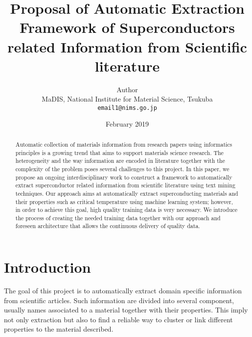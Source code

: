 \documentclass{article}
\title{Proposal of Automatic Extraction Framework of Superconductors related Information from Scientific literature}
\author{
  Author\\
  MaDIS, National Institute for Material Science, Tsukuba\\
  \texttt{email1@nims.go.jp}
}
\date{February 2019}
\begin{document}
\maketitle

\tableofcontents

\pagebreak

\begin{abstract}
Automatic collection of materials information from research papers using informatics principles is a growing trend that aims to support materials science research. The heterogeneity and the way information are encoded in literature together with the complexity of the problem poses several challenges to this project. 
In this paper, we propose an ongoing interdisciplinary work to construct a framework to automatically extract superconductor related information from scientific literature using text mining techniques. Our approach aims at automatically extract superconducting materials and their properties such as critical temperature using machine learning system; however, in order to achieve this goal, high quality training data is very necessary. 
We introduce the process of creating the needed training data together with our approach and foreseen architecture that allows the continuous delivery of quality data.



\end{abstract}

\pagebreak

\section{Introduction}

The goal of this project is to automatically extract domain specific information from scientific articles. Such information are divided into several component, usually names associated to a material together with their properties. This imply not only extraction but also to find a reliable way to cluster or link different properties to the material described. 
\end{document}
